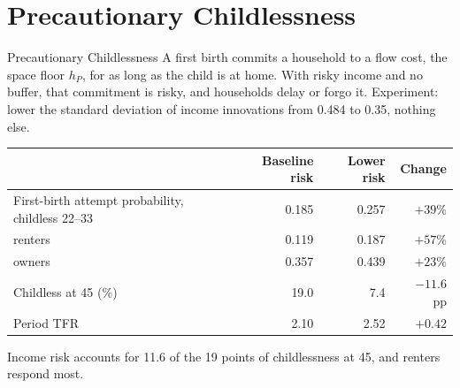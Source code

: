 \section{Precautionary Childlessness}
\begin{frame}[t]{Precautionary Childlessness}
\linespread{1.0}\footnotesize\selectfont
A first birth commits a household to a flow cost, the space floor $h_P$, for as long as the child is at home. With risky income and no buffer,
that commitment is risky, and households delay or forgo it. Experiment: lower the standard deviation of income innovations from 0.484 to 0.35, nothing else.
\smallskip

\scriptsize\setlength{\tabcolsep}{5pt}\renewcommand{\arraystretch}{1.05}
\begin{tabularx}{\textwidth}{@{}Xrrr@{}}
\toprule
 & Baseline risk & Lower risk & Change \\
\midrule
First-birth attempt probability, childless 22--33 & 0.185 & 0.257 & $+39\%$ \\
\quad renters & 0.119 & 0.187 & $+57\%$ \\
\quad owners & 0.357 & 0.439 & $+23\%$ \\
\addlinespace[2pt]
Childless at 45 (\%) & 19.0 & 7.4 & $-11.6$ pp \\
Period TFR & 2.10 & 2.52 & $+0.42$ \\
\bottomrule
\end{tabularx}
\smallskip

\footnotesize Income risk accounts for 11.6 of the 19 points of childlessness at 45, and renters respond most.

\end{frame}

